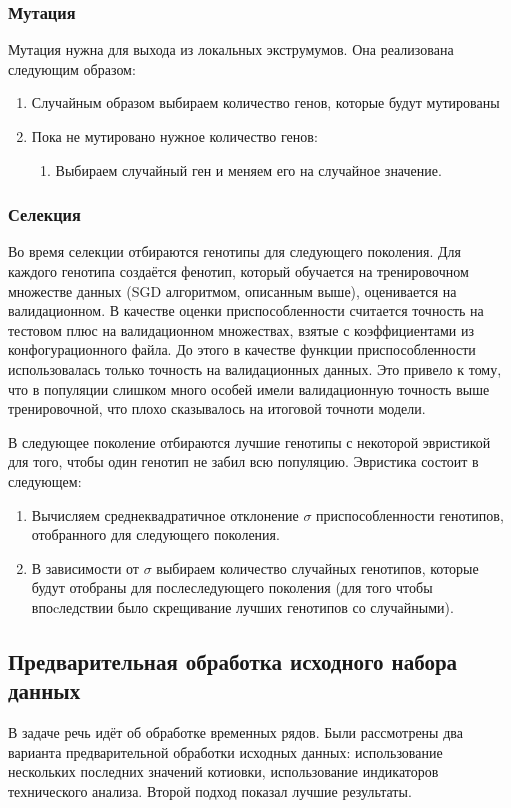 \documentclass[a4paper,12pt]{article}
\begin{document}
\subsubsection{Мутация}
Мутация нужна для выхода из локальных экструмумов.
Она реализована следующим образом:
\begin{enumerate}
\item Случайным образом выбираем количество генов, которые будут мутированы
\item Пока не мутировано нужное количество генов:
\begin{enumerate}
\item Выбираем случайный ген и меняем его на случайное значение.
\end{enumerate}
\end{enumerate}

\subsubsection{Селекция}
Во время селекции отбираются генотипы для следующего поколения. Для каждого генотипа создаётся фенотип, который обучается на тренировочном множестве данных (SGD алгоритмом, описанным выше), оценивается на валидационном. В качестве оценки приспособленности считается точность на тестовом плюс на валидационном множествах, взятые с коэффициентами из конфогурационного файла. До этого в качестве функции приспособленности использовалась только точность на валидационных данных. Это привело к тому, что в популяции слишком много особей имели валидационную точность выше  тренировочной, что плохо сказывалось на итоговой точноти модели.

В следующее поколение отбираются лучшие генотипы с некоторой эвристикой для того, чтобы один генотип не забил всю популяцию. Эвристика состоит в следующем:
\begin{enumerate}
\item Вычисляем среднеквадратичное отклонение $\sigma$ приспособленности генотипов, отобранного для следующего поколения.
\item В зависимости от $\sigma$ выбираем количество случайных генотипов, которые будут отобраны для послеследующего поколения (для того чтобы впоcледствии было скрещивание лучших генотипов со случайными).
\end{enumerate}


\subsection{Предварительная обработка исходного набора данных}
В задаче речь идёт об обработке временных рядов. Были рассмотрены два варианта предварительной обработки исходных данных: использование нескольких последних значений котиовки, использование индикаторов технического анализа. Второй подход показал лучшие результаты.
\end{document}
